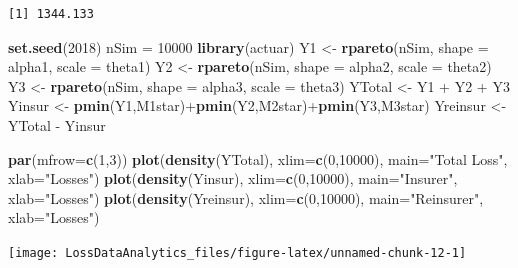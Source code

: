 \documentclass[]{book}
\newenvironment{Shaded}{\begin{snugshade}}{\end{snugshade}}
\newcommand{\KeywordTok}[1]{\textcolor[rgb]{0.13,0.29,0.53}{\textbf{{#1}}}}
\newcommand{\DataTypeTok}[1]{\textcolor[rgb]{0.13,0.29,0.53}{{#1}}}
\newcommand{\DecValTok}[1]{\textcolor[rgb]{0.00,0.00,0.81}{{#1}}}
\newcommand{\StringTok}[1]{\textcolor[rgb]{0.31,0.60,0.02}{{#1}}}
\newcommand{\NormalTok}[1]{{#1}}
\theoremstyle{definition}
\theoremstyle{definition}
\theoremstyle{definition}
\theoremstyle{remark}
\begin{document}
\begin{verbatim}
[1] 1344.133
\end{verbatim}

\begin{Shaded}
\begin{Highlighting}[]
\KeywordTok{set.seed}\NormalTok{(}\DecValTok{2018}\NormalTok{)}
\NormalTok{nSim =}\StringTok{ }\DecValTok{10000}
\KeywordTok{library}\NormalTok{(actuar)}
\NormalTok{Y1 <-}\StringTok{ }\KeywordTok{rpareto}\NormalTok{(nSim, }\DataTypeTok{shape =} \NormalTok{alpha1, }\DataTypeTok{scale =} \NormalTok{theta1)}
\NormalTok{Y2 <-}\StringTok{ }\KeywordTok{rpareto}\NormalTok{(nSim, }\DataTypeTok{shape =} \NormalTok{alpha2, }\DataTypeTok{scale =} \NormalTok{theta2)}
\NormalTok{Y3 <-}\StringTok{ }\KeywordTok{rpareto}\NormalTok{(nSim, }\DataTypeTok{shape =} \NormalTok{alpha3, }\DataTypeTok{scale =} \NormalTok{theta3)}
\NormalTok{YTotal <-}\StringTok{ }\NormalTok{Y1 +}\StringTok{ }\NormalTok{Y2 +}\StringTok{ }\NormalTok{Y3}
\NormalTok{Yinsur <-}\StringTok{  }\KeywordTok{pmin}\NormalTok{(Y1,M1star)+}\KeywordTok{pmin}\NormalTok{(Y2,M2star)+}\KeywordTok{pmin}\NormalTok{(Y3,M3star)}
\NormalTok{Yreinsur <-}\StringTok{ }\NormalTok{YTotal -}\StringTok{ }\NormalTok{Yinsur}

\KeywordTok{par}\NormalTok{(}\DataTypeTok{mfrow=}\KeywordTok{c}\NormalTok{(}\DecValTok{1}\NormalTok{,}\DecValTok{3}\NormalTok{))}
\KeywordTok{plot}\NormalTok{(}\KeywordTok{density}\NormalTok{(YTotal),   }\DataTypeTok{xlim=}\KeywordTok{c}\NormalTok{(}\DecValTok{0}\NormalTok{,}\DecValTok{10000}\NormalTok{), }\DataTypeTok{main=}\StringTok{"Total Loss"}\NormalTok{, }\DataTypeTok{xlab=}\StringTok{"Losses"}\NormalTok{)}
\KeywordTok{plot}\NormalTok{(}\KeywordTok{density}\NormalTok{(Yinsur),   }\DataTypeTok{xlim=}\KeywordTok{c}\NormalTok{(}\DecValTok{0}\NormalTok{,}\DecValTok{10000}\NormalTok{), }\DataTypeTok{main=}\StringTok{"Insurer"}\NormalTok{,    }\DataTypeTok{xlab=}\StringTok{"Losses"}\NormalTok{)}
\KeywordTok{plot}\NormalTok{(}\KeywordTok{density}\NormalTok{(Yreinsur), }\DataTypeTok{xlim=}\KeywordTok{c}\NormalTok{(}\DecValTok{0}\NormalTok{,}\DecValTok{10000}\NormalTok{), }\DataTypeTok{main=}\StringTok{"Reinsurer"}\NormalTok{,  }\DataTypeTok{xlab=}\StringTok{"Losses"}\NormalTok{)}
\end{Highlighting}
\end{Shaded}

\begin{center}\texttt{[image: LossDataAnalytics\_files/figure-latex/unnamed-chunk-12-1]} \end{center}
\end{document}
